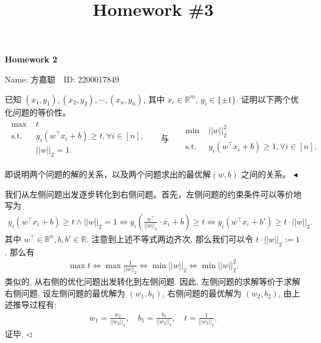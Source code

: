 \documentclass[11pt]{article}
\title{Homework \#3}
\newenvironment{problem}[2][Problem]{\begin{trivlist}
    \item[\hskip \labelsep {\bfseries #1}\hskip \labelsep {\bfseries #2.}]\songti}{\hfill$\blacktriangleleft$\end{trivlist}}
\newenvironment{answer}[1][Solution]{\begin{trivlist}
\item[\hskip \labelsep {\bfseries #1.}\hskip \labelsep]}{\hfill$\lhd$\end{trivlist}}
\newcommand\1{\mathds{1}}
\newcommand\R{\mathbb{R}}
\begin{document}
\kaishu

\pagestyle{fancy}
\chead{\kaishu }
\fancyfoot[R]{} 
\fancyfoot[C]{\thepage\ /\ \pageref{LastPage} \\ \textcolor{lightgray}{Last Compile: \today}}


\begin{center}
    {\LARGE \bf Homework 2}

    {Name: 方嘉聪\ \  ID: 2200017849}            %
\end{center}

\begin{problem}{1}
    已知 $(x_1, y_1), (x_2, y_2), \cdots, (x_n, y_n)$, 其中 $x_i \in \R^m$, $y_i \in \{\pm 1\}$.
    证明以下两个优化问题的等价性。
    \begin{align*}
        \begin{aligned}
            \max \,\,  & t \\
            \text{s.t.} \,\, & y_i(w^\top x_i + b) \geq t, \forall i\in[n],  \\
            & ||w||_2 = 1.
        \end{aligned}
        && \text{与} &&
        \begin{aligned}
            \min \,\,  & ||w||_2^2 \\
            \text{s.t.} \,\, & y_i(w^\top x_i + b) \geq 1, \forall i\in[n].
        \end{aligned}
    \end{align*}

    即说明两个问题的解的关系，以及两个问题求出的最优解$(w, b)$ 之间的关系。
\end{problem}
\begin{answer}
我们从左侧问题出发逐步转化到右侧问题。首先，左侧问题的约束条件可以等价地写为
\begin{align*}
    y_i(w^\top x_i + b) \geq t \land ||w||_2 = 1 \iff y_i\left(\frac{w^\top}{||w||_2} \cdot x_i + b\right) \ge t \iff y_i\left(w^\top x_i + b'\right) \ge t\cdot ||w||_2.
\end{align*}
其中 $w^\top \in \R^n, b, b' \in \R$. 注意到上述不等式两边齐次, 那么我们可以令 $t\cdot||w||_2 := 1$. 那么有 
\begin{align*}
    \max t \iff \max \frac{1}{||w||_2} \iff  \min ||w||_2 \iff \min ||w||_2^2.
\end{align*}
类似的, 从右侧的优化问题出发转化到左侧问题. 因此, 左侧问题的求解等价于求解右侧问题. 设左侧问题的最优解为 $(w_1, b_1)$, 右侧问题的最优解为 $(w_2, b_2)$, 由上述推导过程有: 
\begin{align*}
    w_1 = \frac{w_2}{||w_2||_2}, \quad b_1 = \frac{b_2}{||w_2||_2}, \quad t = \frac{1}{||w_2||_2}.
\end{align*}
证毕.
\end{answer}
\end{document}

